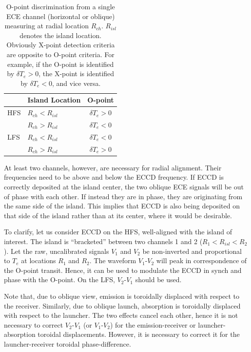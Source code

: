 \documentclass[aps,pra,twocolumn]{revtex4}
\begin{document}
\begin{table}[b] %
\caption{\label{tab1} O-point discrimination from a single ECE
  channel (horizontal or oblique) measuring at radial location $R_{ch}$. 
  $R_{isl}$ denotes the island location. Obviously X-point detection criteria 
  are opposite to O-point criteria. For example, if the O-point is identified 
  by $\delta T_e >0$, the X-point is identified by $\delta T_e <0$, 
  and vice versa.}
\begin{ruledtabular}
\begin{tabular}{llc}
& Island Location & O-point \\
\hline
HFS  &  $R_{ch} < R_{isl}$  &  $\delta T_e >0$ \\
     &  $R_{ch} > R_{isl}$  &  $\delta T_e <0$ \\
LFS  &  $R_{ch} < R_{isl}$  &  $\delta T_e <0$ \\
     &  $R_{ch} > R_{isl}$  &  $\delta T_e >0$ 
\end{tabular}
\end{ruledtabular}
\end{table}

At least two channels, however, are necessary for radial alignment.
Their frequencies need to be above and below the ECCD frequency.  If
ECCD is correctly deposited at the island center, the two oblique ECE
signals will be out of phase with each other. If instead they are in
phase, they are originating from the same side of the island. This implies that 
ECCD is also being deposited on that side of the island rather than at its 
center, where it would be desirable.  

To clarify, let us consider ECCD on the HFS, well-aligned with the 
island of interest. The island is  ``bracketed'' between two channels 1 and 2
($R_1<R_{isl}<R_2$). Let the raw, uncalibrated signals 
$V_1$ and $V_2$ be non-inverted and proportional to $T_e$ 
at locations $R_1$ and $R_2$.  
The waveform $V_1$-$V_2$ will peak in correspondence of the O-point transit. 
Hence, it can be used to modulate the ECCD in synch and phase with the O-point. 
On the LFS, $V_2$-$V_1$ should be used. 

Note that, due to oblique view, emission is toroidally displaced with
respect to the receiver.  Similarly, due to oblique launch,
absorption is toroidally  displaced with respect to the launcher. The
two effects cancel each other, hence it is not necessary to correct
$V_2$-$V_1$ (or $V_1$-$V_2$)  for the emission-receiver or
launcher-absorption toroidal displacements.  However, it is necessary
to correct it for  the launcher-receiver toroidal phase-difference. 
\end{document}
